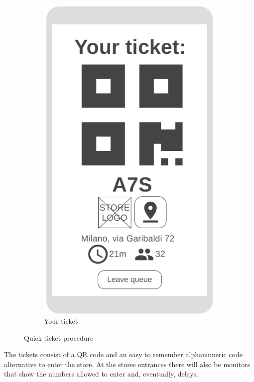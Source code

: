 \begin{figure}[h!]
\begin{subfigure}[b]{0.3\textwidth}
		\includegraphics[width=\linewidth]{../Diagrams/WireframesCLup/Ticket.png}
		\caption{Your ticket}
		\label{fig:WfTicket}
	\end{subfigure}
	\caption{Quick ticket procedure}
	\label{fig:WireframesQuickTicket}
\end{figure}
The tickets consist of a QR code and an easy to remember alphanumeric code alternative to enter the store. At the stores entrances there will also be monitors that show the numbers allowed to enter and, eventually, delays.\newline
